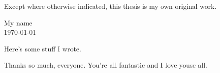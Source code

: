 \documentclass[12pt,xetex]{scrbook}
\begin{document}

\frontmatter


\cleardoublepage

\vspace*{0.4\textheight}

\begin{center}
  Except where otherwise indicated, this thesis is my own original
  work.
\end{center}
\vspace*{4cm}

\begin{flushright}
  \begin{minipage}{4cm}
    My name\\
    \today
  \end{minipage}
\end{flushright}

\cleardoublepage

\label{chap:pub}

Here's some stuff I wrote.

\cleardoublepage

\label{chap:ack}

Thanks so much, everyone.  You're all fantastic and I love youse all.

\cleardoublepage
\end{document}
